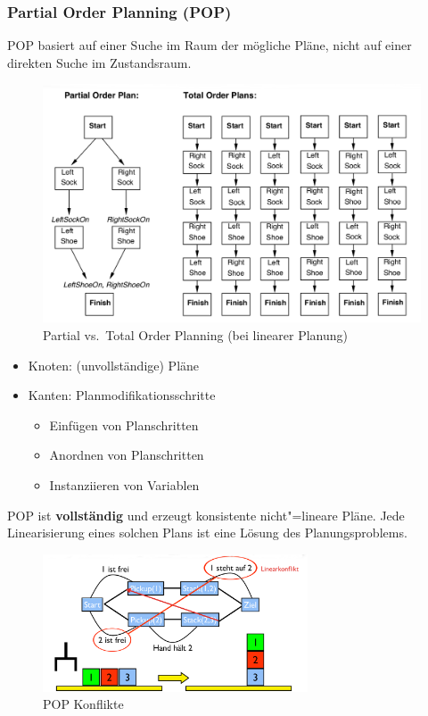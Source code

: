 \subsubsection{Partial Order Planning (POP)}
POP basiert auf einer Suche im Raum der mögliche Pläne, nicht auf einer direkten Suche im Zustandsraum.
\begin{figure}[ht]\centering 
\includegraphics[width=\textwidth]{figures/ch06_partialOrder.png}
\caption{Partial vs.\ Total Order Planning (bei linearer Planung)}
\label{ch06_orderPlanning}
\end{figure}
\begin{itemize}
	\item Knoten: (unvollständige) Pläne
	\item Kanten: Planmodifikationsschritte
	\begin{itemize}
		\item Einfügen von Planschritten
		\item Anordnen von Planschritten
		\item Instanziieren von Variablen
	\end{itemize}
\end{itemize}
POP ist \textbf{vollständig} und erzeugt konsistente nicht"=lineare Pläne. 
Jede Linearisierung eines solchen Plans ist eine Lösung des Planungsproblems.

\begin{figure}[ht]\centering 
\includegraphics[width=0.7\textwidth]{figures/ch06_popKonflikte.png}
\caption{POP Konflikte}
\label{ch06_popKonflikte}
\end{figure}

